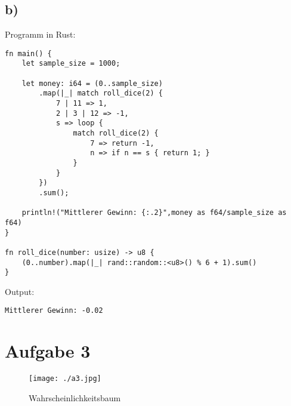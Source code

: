 \documentclass[a4paper]{scrartcl}
\begin{document}
\subsection*{b)}
Programm in Rust:
\begin{lstlisting}
fn main() {
	let sample_size = 1000;
	
	let money: i64 = (0..sample_size)
		.map(|_| match roll_dice(2) {
			7 | 11 => 1,
			2 | 3 | 12 => -1,
			s => loop {
				match roll_dice(2) {
					7 => return -1,
					n => if n == s { return 1; }
				}   
			}
		})
		.sum();

	println!("Mittlerer Gewinn: {:.2}",money as f64/sample_size as f64)
}

fn roll_dice(number: usize) -> u8 {
	(0..number).map(|_| rand::random::<u8>() % 6 + 1).sum()
}   
\end{lstlisting}
Output:
\begin{verbatim}
Mittlerer Gewinn: -0.02
\end{verbatim}
\newpage
\section*{Aufgabe 3}
\begin{figure}[h]
	\centering
	\texttt{[image: ./a3.jpg]}
	\caption{Wahrscheinlichkeitsbaum}
	\label{fig:3}
\end{figure}
\end{document}
